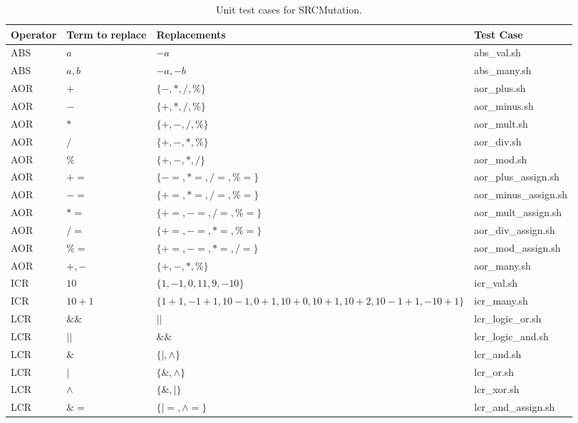 
\setlength\LTleft{0pt}
\setlength\LTright{0pt}
\scriptsize

\begin{longtable}{|p{1cm}|p{5cm}|p{6cm}|p{2.5cm}|}

\caption{Unit test cases for SRCMutation.}
\label{table:matrix} \\

\hline
\textbf{Operator}	&	\textbf{Term to replace}	&	\textbf{Replacements}	&	\textbf{Test Case} \\
\hline
ABS	&	$a$	&	$-a$	&	abs\_val.sh \\
ABS	&	$a,b$	&	$-a,-b$	&	abs\_many.sh \\
AOR	&	$+$	&	$\{-,*,/,\%\}$	&	aor\_plus.sh \\
AOR	&	$-$	&	$\{+,*,/,\%\}$	&	aor\_minus.sh \\
AOR	&	$*$	&	$\{+,-,/,\%\}$	&	aor\_mult.sh \\
AOR	&	$/$	&	$\{+,-,*,\%\}$	&	aor\_div.sh \\
AOR	&	$\%$	&	$\{+,-,*,/\}$	&	aor\_mod.sh \\
AOR	&	$+=$	&	$\{-=,*=,/=,\%=\}$	&	aor\_plus\_assign.sh \\
AOR	&	$-=$	&	$\{+=,*=,/=,\%=\}$	&	aor\_minus\_assign.sh \\
AOR	&	$*=$	&	$\{+=,-=,/=,\%=\}$	&	aor\_mult\_assign.sh \\
AOR	&	$/=$	&	$\{+=,-=,*=,\%=\}$	&	aor\_div\_assign.sh \\
AOR	&	$\%=$	&	$\{+=,-=,*=,/=\}$	&	aor\_mod\_assign.sh \\
AOR	&	$+,-$	&	$\{+,-,*,\%\}$	&	aor\_many.sh \\
ICR	&	$10$	&	$\{1, -1, 0, 11, 9, -10\}$	&	icr\_val.sh \\
ICR	&	$10 + 1$	&	$\{1+1, -1+1, 10-1, 0+1, 10+0, 10+1, 10+2, 10-1+1, -10+1\}$	&	icr\_many.sh \\
LCR	&	$\&\&$	&	$||$	&	lcr\_logic\_or.sh \\
LCR	&	$||$	&	$\&\&$	&	lcr\_logic\_and.sh \\
LCR	&	$\&$	&	$\{|,\land\}$	&	lcr\_and.sh \\
LCR	&	$|$	&	$\{\&,\land\}$	&	lcr\_or.sh \\
LCR	&	$\land$	&	$\{\&,|\}$	&	lcr\_xor.sh \\
LCR	&	$\&=$	&	$\{|=, \land=\}$	&	lcr\_and\_assign.sh \\

\end{longtable}
